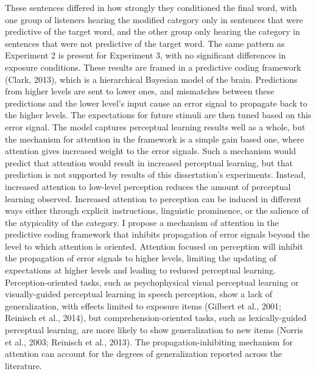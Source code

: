 These sentences differed in how strongly they conditioned the final word, with one group of listeners hearing the modified category only in sentences that were predictive of the target word, and the other group only hearing the category in sentences that were not predictive of the target word.
The same pattern as Experiment 2 is present for Experiment 3, with no significant differences in exposure conditions.
These results are framed in a predictive coding framework (Clark, 2013), which is a hierarchical Bayesian model of the brain. 
Predictions from higher levels are sent to lower ones, and mismatches between these predictions and the lower level's input cause an error signal to propagate back to the higher levels.
The expectations for future stimuli are then tuned based on this error signal.
The model captures perceptual learning results well as a whole, but the mechanism for attention in the framework is a simple gain based one, where attention gives increased weight to the error signals.
Such a mechanism would predict that attention would result in increased perceptual learning, but that prediction is not supported by results of this dissertation's experiments.
Instead, increased attention to low-level perception reduces the amount of perceptual learning observed.
Increased attention to perception can be induced in different ways either through explicit instructions, linguistic prominence, or the salience of the atypicality of the category.
I propose a mechanism of attention in the predictive coding framework that inhibits propagation of error signals beyond the level to which attention is oriented.
Attention focused on perception will inhibit the propagation of error signals to higher levels, limiting the updating of expectations at higher levels and leading to reduced perceptual learning.
Perception-oriented tasks, such as psychophysical visual perceptual learning or visually-guided perceptual learning in speech perception, show a lack of generalization, with effects limited to exposure items (Gilbert et al., 2001; Reinisch et al., 2014), but comprehension-oriented tasks, such as lexically-guided perceptual learning, are more likely to show generalization to new items (Norris et al., 2003; Reinisch et al., 2013).
The propagation-inhibiting mechanism for attention can account for the degrees of generalization reported across the literature.



\vfill
\begin{center}
\begin{sf}
\end{sf}
\end{center}
